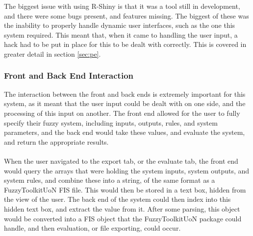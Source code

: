 \noindent 
The biggest issue with using R-Shiny is that it was a tool still in development, and there were some bugs present, and features missing. The biggest of these was the inability to properly handle dynamic user interfaces, such as the one this system required. This meant that, when it came to handling the user input, a hack had to be put in place for this to be dealt with correctly. This is covered in greater detail in section \ref{sec:pe}.

\tocless\subsubsection{Front and Back End Interaction}
\noindent 
The interaction between the front and back ends is extremely important for this system, as it meant that the user input could be dealt with on one side, and the processing of this input on another. The front end allowed for the user to fully specify their fuzzy system, including inputs, outputs, rules, and system parameters, and the back end would take these values, and evaluate the system, and return the appropriate results.\ \\
\ \\
When the user navigated to the export tab, or the evaluate tab, the front end would query the arrays that were holding the system inputs, system outputs, and system rules, and combine these into a string, of the same format as a FuzzyToolkitUoN FIS file. This would then be stored in a text box, hidden from the view of the user. The back end of the system could then index into this hidden text box, and extract the value from it. After some parsing, this object would be converted into a FIS object that the FuzzyToolkitUoN package could handle, and then evaluation, or file exporting, could occur.

